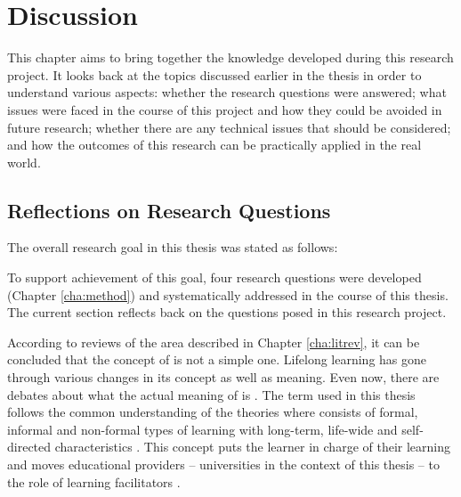 \chapter{Discussion\label{cha:discussion}}
This chapter aims to bring together the knowledge developed during this research
project. It looks back at the topics discussed earlier in the thesis in order to
understand various aspects: whether the research questions were answered; what
issues were faced in the course of this project and how they could be avoided in
future research; whether there are any technical issues that should be
considered; and how the outcomes of this research can be practically applied in
the real world.

\section{Reflections on Research Questions}

The overall research goal in this thesis was stated as follows:


To support achievement of this goal, four research questions were developed
(Chapter \ref{cha:method}) and systematically addressed in the course of this
thesis. The current section reflects back on the questions posed in this
research project.


According to reviews of the area described in Chapter \ref{cha:litrev}, it
can be concluded that the concept of \LLLs is not a simple one. Lifelong
learning has gone through various changes in its concept as well as meaning.
Even now, there are debates about what the actual meaning of \LLLs is
\citep{Griffin2002}. The term used in this thesis follows the common
understanding of the theories where \LLLs consists of formal, informal and
non-formal types of learning with long-term, life-wide and self-directed
characteristics \citep{Longworth2003,Rubenson2002,Schuetze2006}. This concept
puts the learner in charge of their learning and moves educational providers --
universities in the context of this thesis -- to the role of learning
facilitators \citep{Boshier2000}.

